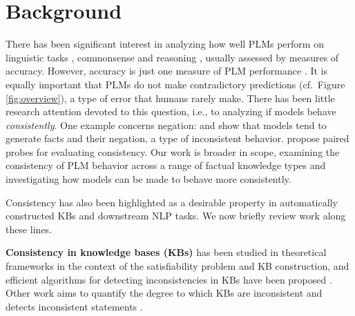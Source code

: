 







\section{Background}
\label{sec:background}
There has been significant interest in analyzing how well
PLMs \cite{rogers2020primer} perform on
linguistic tasks
\cite{yoav-syntax,hewitt2019structural,tenney2019bert,amnesic_probing},
commonsense \cite{forbes2019neural,
  da2019cracking,zhang2020language} and reasoning
\cite{talmor2019olmpics,
  kassner-etal-2020-pretrained}, usually assessed by
measures of accuracy.
However, accuracy is just one measure of PLM performance \cite{linzen2020can}. It is
equally important that PLMs do not make contradictory
predictions (cf.\ Figure \ref{fig:overview}), a type of
error that humans rarely make.
There has been
little research attention devoted to this
question, i.e., to analyzing if
models behave \emph{consistently}.
One example concerns negation:
\citet{Ettinger_2020} and \citet{kassner-schutze-2020-negated}
show
that models tend to generate facts and their negation, a
type of inconsistent behavior.
propose paired probes for evaluating consistency.
 Our work is
broader in scope, examining the consistency of PLM behavior across a
range of factual knowledge types and investigating how
models can be made to behave more consistently.


Consistency has also been highlighted as a desirable
property in automatically constructed KBs and downstream NLP
tasks. We now briefly review work along these lines.

\textbf{Consistency in knowledge bases (KBs)} has been
studied in theoretical frameworks in the context of the
satisfiability problem and KB construction, and efficient
algorithms for detecting inconsistencies in KBs have been
proposed \cite{hansen2000probabilistic,andersen2001easy}.
Other work aims to quantify the degree to which KBs are
inconsistent and detects inconsistent statements
\cite{Thimm:2009d,muino2011measuring,Thimm:2013}.




